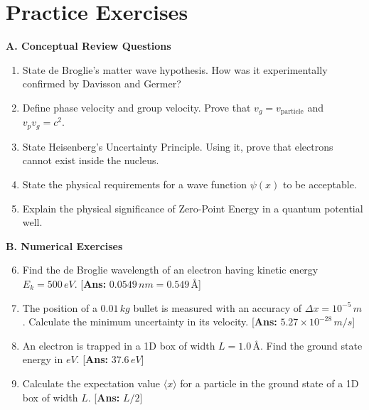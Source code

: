 \section{Practice Exercises}

\begin{practiceset}
\textbf{A. Conceptual Review Questions}
\begin{enumerate}
    \item State de Broglie's matter wave hypothesis. How was it experimentally confirmed by Davisson and Germer?
    \item Define phase velocity and group velocity. Prove that $v_g = v_{\text{particle}}$ and $v_p v_g = c^2$.
    \item State Heisenberg's Uncertainty Principle. Using it, prove that electrons cannot exist inside the nucleus.
    \item State the physical requirements for a wave function $\psi(x)$ to be acceptable.
    \item Explain the physical significance of Zero-Point Energy in a quantum potential well.
\end{enumerate}

\textbf{B. Numerical Exercises}
\begin{enumerate}
    \setcounter{enumi}{5}
    \item Find the de Broglie wavelength of an electron having kinetic energy $E_k = 500\,\si{eV}$. \hfill [\textbf{Ans:} $0.0549\,\si{nm} = 0.549\,\si{\text{\AA}}$]
    \item The position of a $0.01\,\si{kg}$ bullet is measured with an accuracy of $\Delta x = 10^{-5}\,\si{m}$. Calculate the minimum uncertainty in its velocity. \hfill [\textbf{Ans:} $5.27 \times 10^{-28}\,\si{m/s}$]
    \item An electron is trapped in a 1D box of width $L = 1.0\,\si{\text{\AA}}$. Find the ground state energy in $\si{eV}$. \hfill [\textbf{Ans:} $37.6\,\si{eV}$]
    \item Calculate the expectation value $\langle x \rangle$ for a particle in the ground state of a 1D box of width $L$. \hfill [\textbf{Ans:} $L/2$]
\end{enumerate}
\end{practiceset}

